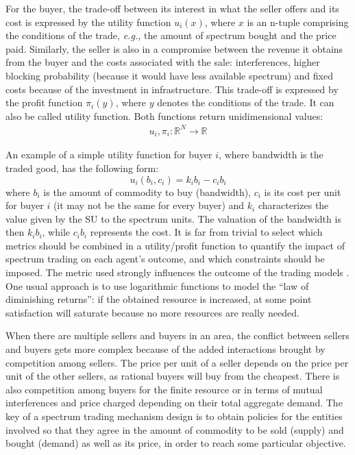 For the buyer, the trade-off between its interest in what the seller offers and its cost is expressed by the utility function $u_i(x)$, where $x$ is an n-tuple comprising the conditions of the trade, \textit{e.g.,} the amount of spectrum bought and the price paid. Similarly, the seller is also in a compromise between the revenue it obtains from the buyer and the costs associated with the sale: interferences, higher blocking probability (because it would have less available spectrum) and fixed costs because of the investment in infrastructure. This trade-off is expressed by the profit function $\pi_i(y)$, where $y$ denotes the conditions of the trade. It can also be called utility function. Both functions return unidimensional values:
\begin{equation}
\begin {array} {lcl}
u_i, \pi_i :  \mathbb{R}^N \rightarrow \mathbb{R}
\end{array}
\end{equation}

An example of a simple utility function for buyer $i$, where bandwidth is the traded good, has the following form:
\begin{equation}
u_{i}(b_{i}, c_{i}) = k_{i}b_{i}-c_{i}b_{i}
\end{equation}
where $b_{i}$ is the amount of commodity to buy (bandwidth), $c_i$ is its cost per unit for buyer $i$ (it may not be the same for every buyer) and $k_{i}$ characterizes the value given by the SU to the spectrum units. The valuation of the bandwidth is then $k_{i}b_{i}$, while $c_{i}b_{i}$ represents the cost. It is far from trivial to select which metrics should be combined in a utility/profit function to quantify the impact of spectrum trading on each agent's outcome, and which constraints should be imposed. The metric used strongly influences the outcome of the trading models \cite{ref:YZhao2009}. One usual approach is to use logarithmic functions to model the ``law of diminishing returns'': if the obtained resource is increased, at some point satisfaction will saturate because no more resources are really needed.

When there are multiple sellers and buyers in an area,  the conflict between sellers and buyers gets more complex because of the added interactions brought by competition among sellers. The price per unit of a seller depends on the price per unit of the other sellers, as rational buyers will buy from the cheapest. There is also competition among buyers for the finite resource or in terms of mutual interferences and price charged depending on their total aggregate demand. The key of a spectrum trading mechanism design is to obtain policies for the entities involved so that they agree in the amount of commodity to be sold (supply) and bought (demand) as well as its price, in order to reach some particular objective. 

